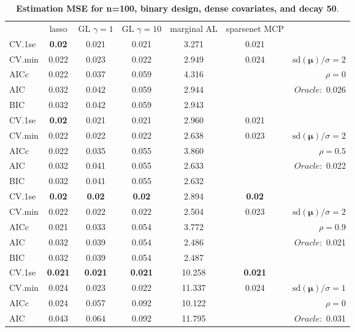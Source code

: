 \clearpage
\begin{table}\vspace{-.5cm}
\caption[l]{ { \bf Estimation MSE for n=100, binary design, 
dense covariates, and  decay  50}.}
\vspace{-.5cm}
\footnotesize{}
\begin{center}
\begin{tabular}{l*{5}{c}|r}
& lasso & GL $\gamma=1$ & GL $\gamma=10$ & marginal AL & sparsenet MCP  & \\
 \cline{1-7}
CV.1se & {\bf 0.02} & 0.021 & 0.021 & 3.271 & 0.021 & \\
CV.min & 0.022 & 0.023 & 0.022 & 2.949 & 0.024 &  $\mathrm{sd}(\mathbf{\mu})/\sigma=2$ \\
AICc & 0.022 & 0.037 & 0.059 & 4.316 & & $\rho=0$ \\
AIC & 0.032 & 0.042 & 0.059 & 2.944 & &  \multirow{2}{*}{$Oracle: $ 0.026} \\
BIC & 0.032 & 0.042 & 0.059 & 2.943 & &  \\
 \hline 
CV.1se & {\bf 0.02} & 0.021 & 0.021 & 2.960 & 0.021 & \\
CV.min & 0.022 & 0.022 & 0.022 & 2.638 & 0.023 &  $\mathrm{sd}(\mathbf{\mu})/\sigma=2$ \\
AICc & 0.022 & 0.035 & 0.055 & 3.860 & & $\rho=0.5$ \\
AIC & 0.032 & 0.041 & 0.055 & 2.633 & &  \multirow{2}{*}{$Oracle: $ 0.022} \\
BIC & 0.032 & 0.041 & 0.055 & 2.632 & &  \\
 \hline 
CV.1se & {\bf 0.02} & {\bf 0.02} & {\bf 0.02} & 2.894 & {\bf 0.02} & \\
CV.min & 0.022 & 0.022 & 0.022 & 2.504 & 0.023 &  $\mathrm{sd}(\mathbf{\mu})/\sigma=2$ \\
AICc & 0.021 & 0.033 & 0.054 & 3.772 & & $\rho=0.9$ \\
AIC & 0.032 & 0.039 & 0.054 & 2.486 & &  \multirow{2}{*}{$Oracle: $ 0.021} \\
BIC & 0.032 & 0.039 & 0.054 & 2.487 & &  \\
 \hline 
CV.1se & {\bf 0.021} & {\bf 0.021} & {\bf 0.021} & 10.258 & {\bf 0.021} & \\
CV.min & 0.024 & 0.023 & 0.022 & 11.337 & 0.024 &  $\mathrm{sd}(\mathbf{\mu})/\sigma=1$ \\
AICc & 0.024 & 0.057 & 0.092 & 10.122 & & $\rho=0$ \\
AIC & 0.043 & 0.064 & 0.092 & 11.795 & &  \multirow{2}{*}{$Oracle: $ 0.031} \\

\end{tabular}
\end{center}
\end{table}
